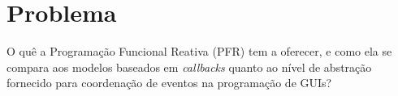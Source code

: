\section{Problema}\label{lproblema}

O quê a Programação Funcional Reativa (PFR) tem a oferecer, e como ela se
compara aos modelos baseados em \emph{callbacks} quanto ao nível de abstração
fornecido para coordenação de eventos na programação de GUIs?

%
%
%

